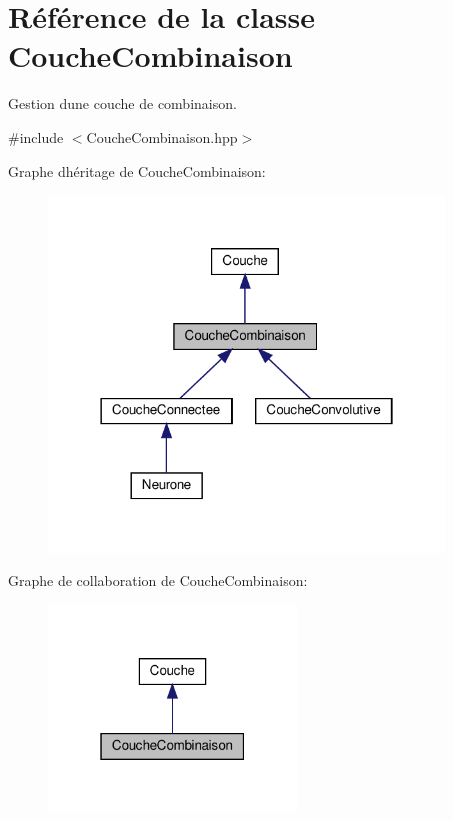 \hypertarget{classCoucheCombinaison}{}\section{Référence de la classe Couche\+Combinaison}
\label{classCoucheCombinaison}


Gestion d\textquotesingle{}une couche de combinaison.  




{\ttfamily \#include $<$Couche\+Combinaison.\+hpp$>$}



Graphe d\textquotesingle{}héritage de Couche\+Combinaison\+:
\nopagebreak
\begin{figure}[H]
\begin{center}
\leavevmode
\includegraphics[width=298pt]{classCoucheCombinaison__inherit__graph}
\end{center}
\end{figure}


Graphe de collaboration de Couche\+Combinaison\+:
\nopagebreak
\begin{figure}[H]
\begin{center}
\leavevmode
\includegraphics[width=187pt]{classCoucheCombinaison__coll__graph}
\end{center}
\end{figure}
